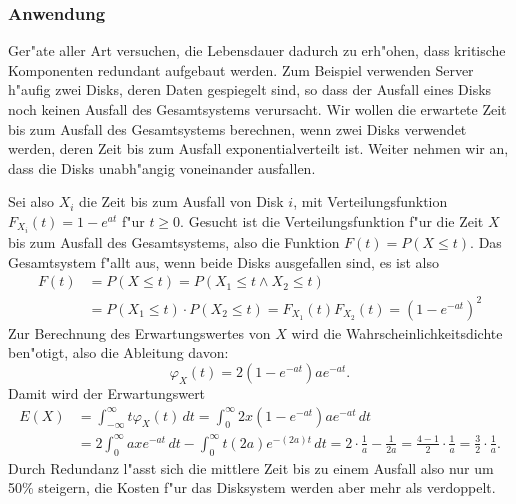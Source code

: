 \subsubsection{Anwendung}
Ger"ate aller Art versuchen, die Lebensdauer dadurch zu erh"ohen, dass
kritische Komponenten redundant aufgebaut werden.
Zum Beispiel verwenden Server h"aufig zwei Disks, deren Daten
gespiegelt sind, so dass der Ausfall eines Disks noch keinen Ausfall
des Gesamtsystems verursacht. Wir wollen die erwartete Zeit bis zum
Ausfall des Gesamtsystems berechnen, wenn zwei Disks verwendet werden,
deren Zeit bis zum Ausfall exponentialverteilt ist. Weiter nehmen
wir an, dass die Disks unabh"angig voneinander ausfallen.

Sei also $X_i$ die Zeit bis zum Ausfall von Disk $i$, mit
Verteilungsfunktion $F_{X_i}(t)=1-e^{at}$ f"ur $t\ge 0$. Gesucht
ist die Verteilungsfunktion f"ur die Zeit $X$ bis zum Ausfall
des Gesamtsystems, also die Funktion $F(t)=P(X\le t)$. Das Gesamtsystem
f"allt aus, wenn beide Disks ausgefallen sind, es ist also
\begin{align*}
F(t)
&=P(X\le t)=P(X_1\le t\wedge X_2\le t)\\
&=P(X_1\le t)\cdot P(X_2\le t)
= F_{X_1}(t) F_{X_2}(t)=(1-e^{-at})^2
\end{align*}
Zur Berechnung des Erwartungswertes von $X$ wird die
Wahrscheinlichkeitsdichte ben"otigt, also die Ableitung davon:
\[
\varphi_{X}(t)=2(1-e^{-at})ae^{-at}.
\]
Damit wird der Erwartungswert
\begin{align*}
E(X)
&=
\int_{-\infty}^{\infty}t\varphi_X(t)\,dt
=\int_0^\infty 2x(1-e^{-at})ae^{-at}\,dt
\\
&=2\int_0^\infty axe^{-at}\,dt - \int_0^\infty t (2a)e^{-(2a)t}\,dt
=2\cdot\frac1a-\frac1{2a}=\frac{4-1}2\cdot\frac1a=\frac32\cdot\frac1a.
\end{align*}
Durch Redundanz l"asst sich die mittlere Zeit bis zu einem Ausfall
also nur um 50\% steigern, die Kosten f"ur das Disksystem werden
aber mehr als verdoppelt.

